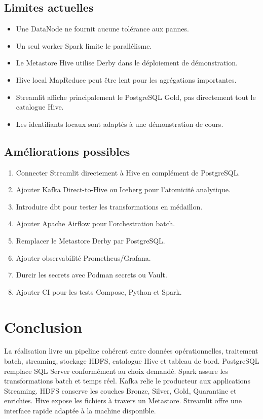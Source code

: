 \documentclass[11pt,a4paper]{report}
\begin{document}
\section{Limites actuelles}
\begin{itemize}
\item Une DataNode ne fournit aucune tolérance aux pannes.
\item Un seul worker Spark limite le parallélisme.
\item Le Metastore Hive utilise Derby dans le déploiement de démonstration.
\item Hive local MapReduce peut être lent pour les agrégations importantes.
\item Streamlit affiche principalement le PostgreSQL Gold, pas directement tout le catalogue Hive.
\item Les identifiants locaux sont adaptés à une démonstration de cours.
\end{itemize}

\section{Améliorations possibles}
\begin{enumerate}
\item Connecter Streamlit directement à Hive en complément de PostgreSQL.
\item Ajouter Kafka Direct-to-Hive ou Iceberg pour l'atomicité analytique.
\item Introduire dbt pour tester les transformations en médaillon.
\item Ajouter Apache Airflow pour l'orchestration batch.
\item Remplacer le Metastore Derby par PostgreSQL.
\item Ajouter observabilité Prometheus/Grafana.
\item Durcir les secrets avec Podman secrets ou Vault.
\item Ajouter CI pour les tests Compose, Python et Spark.
\end{enumerate}

\chapter{Conclusion}

La réalisation livre un pipeline cohérent entre données opérationnelles,
traitement batch, streaming, stockage HDFS, catalogue Hive et tableau de bord.
PostgreSQL remplace SQL Server conformément au choix demandé. Spark assure
les transformations batch et temps réel. Kafka relie le producteur aux
applications Streaming. HDFS conserve les couches Bronze, Silver, Gold,
Quarantine et enrichies. Hive expose les fichiers à travers un Metastore.
Streamlit offre une interface rapide adaptée à la machine disponible.
\end{document}
